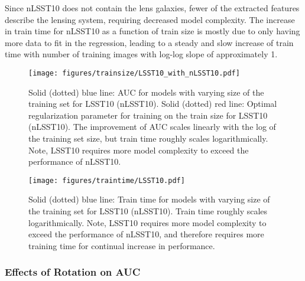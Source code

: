 \documentclass{emulateapj}
\begin{document}
Since nLSST10 does not contain the lens galaxies, fewer of the
extracted features describe the lensing system, requiring decreased
model complexity.  The increase in train time for nLSST10 as a
function of train size is mostly due to only having more data to fit
in the regression, leading to a steady and slow increase of train time
with number of training images with log-log slope of approximately 1.

\begin{figure}[t]
\begin{center}
\texttt{[image: figures/trainsize/LSST10\_with\_nLSST10.pdf]}
\caption{Solid (dotted) blue line: AUC for models with varying size of
  the training set for LSST10 (nLSST10).  Solid (dotted) red line:
  Optimal regularization parameter for training on the train size for
  LSST10 (nLSST10). The improvement of AUC scales linearly with the
  log of the training set size, but train time roughly scales
  logarithmically.  Note, LSST10 requires more model complexity to
  exceed the performance of nLSST10.}\label{fig:trainsizeLSST10}
\end{center}
\end{figure}

\begin{figure}[t]
\begin{center}
\texttt{[image: figures/traintime/LSST10.pdf]}
\caption{Solid (dotted) blue line: Train time for models with varying
  size of the training set for LSST10 (nLSST10).  Train time roughly
  scales logarithmically.  Note, LSST10 requires more model complexity
  to exceed the performance of nLSST10, and therefore requires more
  training time for continual increase in
  performance.}\label{fig:traintimeLSST10}
\end{center}
\end{figure}

\subsubsection{Effects of Rotation on AUC}
\end{document}
